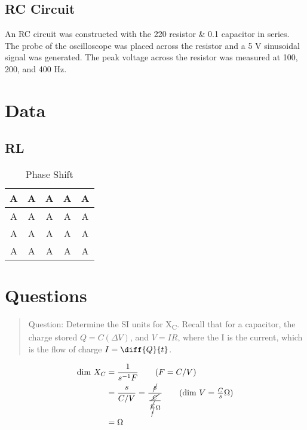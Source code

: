 \documentclass{article}
\begin{document}
		\subsection{RC Circuit}
			An RC circuit was constructed with the 220 \textOmega resistor \& 0.1 \textOmega capacitor in series. The probe of the oscilloscope was placed across the resistor and a 5 V sinusoidal signal was generated. The peak voltage across the resistor was measured at 100, 200, and 400 Hz.


	\section{Data}
		\subsection{RL}
			\begin{table}[htbp]
	\centering
	\caption{Phase Shift}
	\begin{tabular}{ccccc}
		\hline
		A & A & A & A & A \\ \hline
		A & A & A & A & A \\
		A & A & A & A & A \\
		A & A & A & A & A \\ \hline
	\end{tabular}
\end{table}

		
	\section{}

	\section{Questions}
		\begin{quotation}
			Question: Determine the SI units for X\textsubscript{C}. Recall that for a capacitor, the charge stored $Q = C(\Delta V)$, and $V = IR$, where the I is the current, which is the flow of charge $I = \diff{Q}{t}$.
		\end{quotation}
		\begin{align*}
			\text{dim } X_C &= \frac{1}{s^{-1} F} \tag{$F = C/V$}\\
			&= \frac{s}{C/V} = \frac{\cancel{s}}{\frac{\cancel{C}}{\frac{\cancel{C}}{\cancel{s}} \Omega}} \tag{$\text{dim }V = \frac{C}{s} \Omega$}\\
			&= \Omega
		\end{align*}
		
\end{document}
